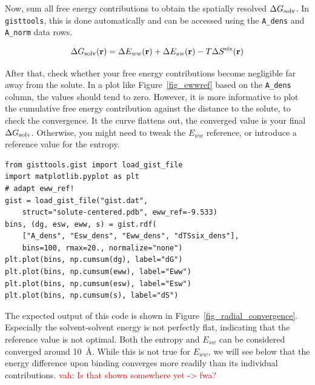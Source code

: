 \documentclass[9pt,tutorial]{livecoms}
\newcommand{\dgsolv}{\Delta G_\textup{solv}}
\newcommand{\software}{\texttt}
\newcommand{\todo}{\textcolor{red}}
\newcommand\inlinecode{\texttt}
\begin{document}
Now, sum all free energy contributions to obtain the spatially resolved $\dgsolv$.
In \software{gisttools}, this is done automatically and can be accessed using the \inlinecode{A\_dens} and \inlinecode{A\_norm} data rows.

\newcommand{\coordinate}{\mathbf{r}}
\begin{equation}
	\dgsolv(\coordinate) = \Delta E_{ww}(\coordinate) + \Delta E_{sw}(\coordinate) - T\Delta S^\text{six}(\coordinate)
\end{equation}

After that, check whether your free energy contributions become negligible far away from the solute.
In a plot like Figure~\ref{fig_ewwref} based on the \inlinecode{A\_dens} column, the values should tend to zero.
However, it is more informative to plot the cumulative free energy contribution against the distance to the solute, to check the convergence.
It the curve flattens out, the converged value is your final $\dgsolv$\@.
Otherwise, you might need to tweak the $E_{ww}$ reference, or introduce a reference value for the entropy.

\begin{lstlisting}[style=python]
from gisttools.gist import load_gist_file
import matplotlib.pyplot as plt
# adapt eww_ref!
gist = load_gist_file("gist.dat",
    struct="solute-centered.pdb", eww_ref=-9.533)
bins, (dg, esw, eww, s) = gist.rdf(
    ["A_dens", "Esw_dens", "Eww_dens", "dTSsix_dens"],
    bins=100, rmax=20., normalize="none")
plt.plot(bins, np.cumsum(dg), label="dG")
plt.plot(bins, np.cumsum(eww), label="Eww")
plt.plot(bins, np.cumsum(esw), label="Esw")
plt.plot(bins, np.cumsum(s), label="dS")
\end{lstlisting}

The expected output of this code is shown in Figure~\ref{fig_radial_convergence}.
Especially the solvent-solvent energy is not perfectly flat, indicating that the reference value is not optimal.
Both the entropy and $E_{sw}$ can be considered converged around \SI{10}{\angstrom}.
While this is not true for $E_{ww}$, we will see below that the energy difference upon binding converges more readily than its individual contributions.
\todo{vah: Is that shown somewhere yet -> fwa?}
\end{document}
